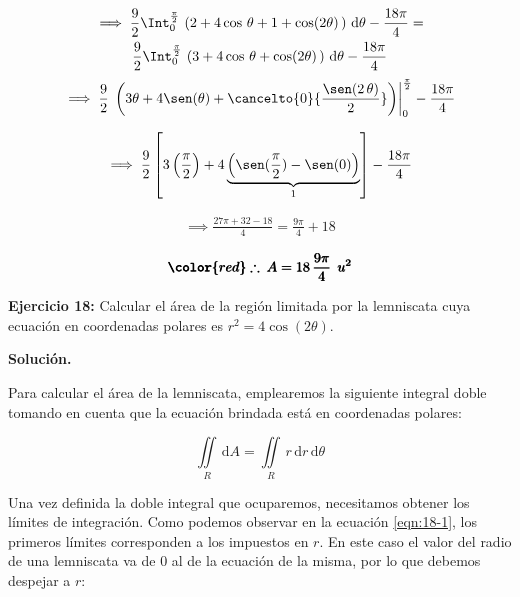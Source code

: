 \documentclass[12pt]{article}
\begin{document}
\begin{multline*}
	\implies \frac{9}{2}\Int_{0}^{\frac{\pi}{2}}\, \left(2+4\cos\,\theta+1+\cos(2\theta)\,\right)\, \mathrm{d}\theta - \frac{18\pi}{4} =\\ \frac{9}{2}\Int_{0}^{\frac{\pi}{2}}\, \left(3+4\cos\,\theta+\cos(2\theta)\,\right)\, \mathrm{d}\theta - \frac{18\pi}{4}
\end{multline*}
\begin{align*}
	\implies \frac{9}{2}\,\left.\left(3\theta+4\sen(\theta)+\cancelto{0}{\frac{\sen(2\,\theta)}{2}}\right)\right|_{0}^{\frac{\pi}{2}} - \frac{18\pi}{4}
\end{align*}

\begin{align*}
	\implies \frac{9}{2}\left[3\left(\frac{\pi}{2}\right) + 4\underbrace{\left(\sen(\frac{\pi}{2})-\sen(0)\right)}_{1} \right] - \frac{18\pi}{4}
\end{align*}

\begin{align*}
	\implies \frac{27\pi + 32 - 18}{4} = \frac{9\pi}{4} + 18
\end{align*}

\begin{align*}
	\pmb{\color{red} \therefore\: A = 18\,\frac{9\pi}{4}\: \: u^2}
\end{align*}

\noindent \textbf{Ejercicio 18:} Calcular el área de la región limitada por la lemniscata cuya ecuación en coordenadas polares es $r^2=4\cos(2\theta)$.

\vspace{5mm}

\noindent \textbf{Solución.}

\vspace{3mm}

\noindent Para calcular el área de la lemniscata, emplearemos la siguiente integral doble tomando en cuenta que la ecuación brindada está en coordenadas polares:

\begin{equation}\label{eqn:18-1}\tag{1}
	\iint\limits_R\, \mathrm{d}A = \iint\limits_R\, r\,\mathrm{d}r\,\mathrm{d}\theta
\end{equation}

\noindent Una vez definida la doble integral que ocuparemos, necesitamos obtener los límites de integración. Como podemos observar en la ecuación \eqref{eqn:18-1}, los primeros límites corresponden a los impuestos en $r$. En este caso el valor del radio de una lemniscata va de $0$ al de la ecuación de la misma, por lo que debemos despejar a $r$:
\end{document}

